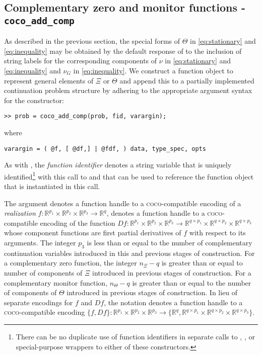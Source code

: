 \subsection{Complementary zero and monitor functions - \texttt{coco\_add\_comp}}
As described in the previous section, the special forms of $\Theta$ in \eqref{eq:stationary} and \eqref{eq:inequality} may be obtained by the default response of  to the inclusion of string labels for the corresponding components of $\nu$ in \eqref{eq:stationary} and \eqref{eq:inequality} and $\nu_G$ in \eqref{eq:inequality}. We construct a function object to represent general elements of $\Xi$ or $\Theta$ and append this to a partially implemented continuation problem structure  by adhering to the appropriate argument syntax for the  constructor:
\begin{lstlisting}[language=coco-highlight]
>> prob = coco_add_comp(prob, fid, varargin);
\end{lstlisting}
where
\begin{lstlisting}[language=coco-highlight]
varargin = ( @f, [ @df,] | @fdf, ) data, type_spec, opts
\end{lstlisting}
As with , the \emph{function identifier}  denotes a string variable that is uniquely identified\footnote{There can be no duplicate use of function identifiers in separate calls to , , or special-purpose wrappers to either of these constructors.} with this call to  and that can be used to reference the function object that is instantiated in this call.

The argument  denotes a function handle to a \textsc{coco}-compatible encoding of a \emph{realization}  $f:\mathbb{R}^{p_1}\times\mathbb{R}^{p_2}\times\mathbb{R}^{p_3}\rightarrow\mathbb{R}^{q}$,  denotes a function handle to a \textsc{coco}-compatible encoding of the function $Df:\mathbb{R}^{p_1}\times\mathbb{R}^{p_2}\times\mathbb{R}^{p_3}\rightarrow\mathbb{R}^{q\times p_1}\times\mathbb{R}^{q\times p_2}\times\mathbb{R}^{q\times p_3}$ whose component functions are first partial derivatives of $f$ with respect to its arguments. The integer $p_3$ is less than or equal to the number of complementary continuation variables introduced in this and previous stages of construction. For a complementary zero function, the integer $n_\Xi-q$ is greater than or equal to number of components of $\Xi$ introduced in previous stages of construction. For a complementary monitor function, $n_\Theta-q$ is greater than or equal to the number of components of $\Theta$ introduced in previous stages of construction. In lieu of separate encodings for $f$ and $Df$, the notation  denotes a function handle to a \textsc{coco}-compatible encoding $\{f,Df\}:\mathbb{R}^{p_1}\times\mathbb{R}^{p_2}\times\mathbb{R}^{p_3}\rightarrow\{\mathbb{R}^{q},\mathbb{R}^{q\times p_1}\times\mathbb{R}^{q\times p_2}\times\mathbb{R}^{q\times p_3}\}$.

